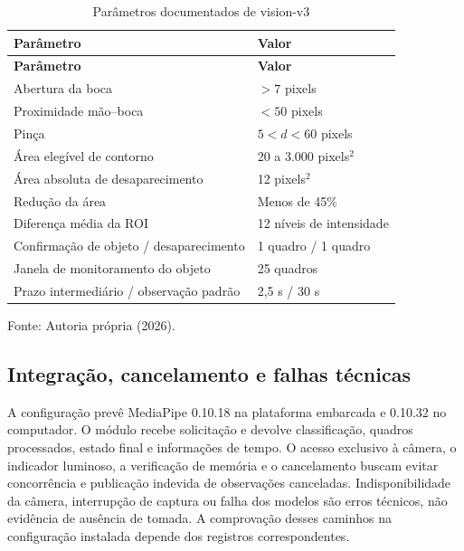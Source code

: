 {\small\setlength{\tabcolsep}{3pt}
\begin{longtable}{p{}p{}}
\caption{Parâmetros documentados de vision-v3}\label{tab:vis-parametros}\\
\hline\textbf{Parâmetro} & \textbf{Valor}\\\hline\endfirsthead
\hline\textbf{Parâmetro} & \textbf{Valor}\\\hline\endhead
Abertura da boca & $>7$ pixels\\\hline
Proximidade mão--boca & $<50$ pixels\\\hline
Pinça & $5<d<60$ pixels\\\hline
Área elegível de contorno & 20 a 3.000 pixels$^2$\\\hline
Área absoluta de desaparecimento & 12 pixels$^2$\\\hline
Redução da área & Menos de 45\%\\\hline
Diferença média da ROI & 12 níveis de intensidade\\\hline
Confirmação de objeto / desaparecimento & 1 quadro / 1 quadro\\\hline
Janela de monitoramento do objeto & 25 quadros\\\hline
Prazo intermediário / observação padrão & 2,5 s / 30 s\\\hline
\end{longtable}
\noindent Fonte: Autoria própria (2026).\par}

\subsection{Integração, cancelamento e falhas técnicas}
A configuração prevê MediaPipe 0.10.18 na plataforma embarcada e 0.10.32 no computador. O módulo recebe solicitação e devolve classificação, quadros processados, estado final e informações de tempo. O acesso exclusivo à câmera, o indicador luminoso, a verificação de memória e o cancelamento buscam evitar concorrência e publicação indevida de observações canceladas. Indisponibilidade da câmera, interrupção de captura ou falha dos modelos são erros técnicos, não evidência de ausência de tomada. A comprovação desses caminhos na configuração instalada depende dos registros correspondentes. 

